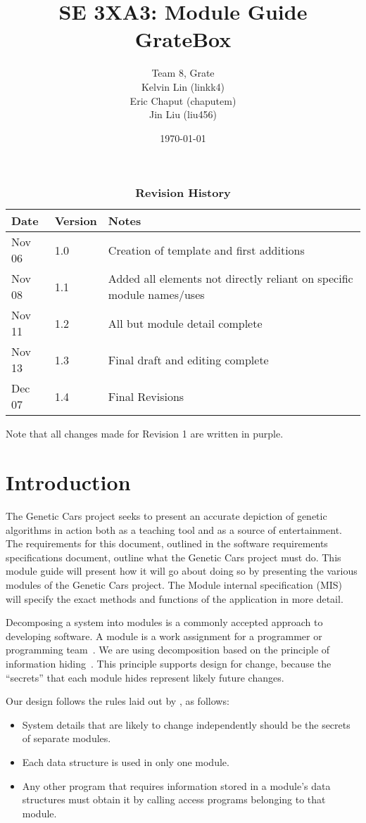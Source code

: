 \documentclass[12pt, titlepage]{article}
\title{SE 3XA3: Module Guide\\GrateBox}
\author{Team 8, Grate
		\\ Kelvin Lin (linkk4)
		\\ Eric Chaput (chaputem)
		\\ Jin Liu (liu456)
}
\date{\today}
\begin{document}
\maketitle

\tableofcontents
\listoftables
\begin{table}[h]
\caption{\bf Revision History}
\begin{tabularx}{\textwidth}{p{3cm}p{2cm}X}
\toprule {\bf Date} & {\bf Version} & {\bf Notes}\\
\midrule
Nov 06 & 1.0 & Creation of template and first additions\\
Nov 08 & 1.1 & Added all elements not directly reliant on specific module 
names/uses\\
Nov 11 & 1.2 & All but module detail complete\\
Nov 13 & 1.3 & Final draft and editing complete\\
Dec 07 & 1.4 & Final Revisions\\
\bottomrule
\end{tabularx}
\end{table}
\newpage
Note that all changes made for Revision 1 are written in purple.
\newpage

\section{Introduction}

The Genetic Cars project seeks to present an accurate depiction of genetic 
algorithms in action both as a teaching tool and as a source of entertainment. 
The requirements for this document, outlined in the software requirements 
specifications document, outline what the Genetic Cars project must do. This 
module guide will present how it will go about doing so by presenting the 
various modules of the Genetic Cars project. The Module internal specification 
(MIS) will specify the exact methods and functions of the application in more 
detail.

Decomposing a system into modules is a commonly accepted approach to developing
software.  A module is a work assignment for a programmer or programming
team~\citep{ParnasEtAl1984}.  We are using decomposition
based on the principle of information hiding~\citep{Parnas1972a}.  This
principle supports design for change, because the ``secrets'' that each module
hides represent likely future changes.  

Our design follows the rules laid out by \citet{ParnasEtAl1984}, as follows:
\begin{itemize}
\item System details that are likely to change independently should be the
  secrets of separate modules.
\item Each data structure is used in only one module.
\item Any other program that requires information stored in a module's data
  structures must obtain it by calling access programs belonging to that module.
\end{itemize}
\end{document}
